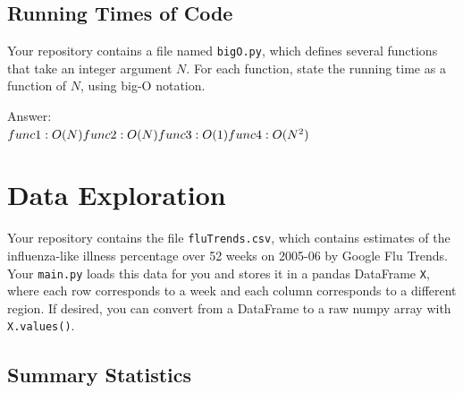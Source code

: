 \documentclass{article}
\def\ans#1{\par\gre{Answer: #1}}
\def\blu#1{{\color{blu}#1}}
\def\gre#1{{\color{gre}#1}}
\begin{document}
\clearpage

\subsection{Running Times of Code}

Your repository contains a file named \texttt{bigO.py}, which defines several functions
that take an integer argument $N$. For each function, \blu{state the running time as a function of $N$, using big-O notation}.
\ans{\\
$func1: O(N)\\
func2: O(N)\\
func3: O(1)\\
func4: O(N^2)$
}

\clearpage

\section{Data Exploration}


  Your repository contains the file \texttt{fluTrends.csv}, which contains estimates
  of the influenza-like illness percentage over 52 weeks on 2005-06 by Google Flu Trends.
  Your \texttt{main.py} loads this data for you and stores it in a pandas DataFrame \texttt{X},
  where each row corresponds to a week and each column
  corresponds to a different
  region. If desired, you can convert from a DataFrame to a raw numpy array with \texttt{X.values()}.

  \subsection{Summary Statistics}
\end{document}
